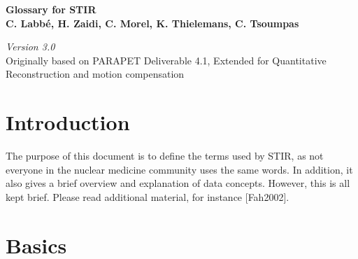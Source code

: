 \documentclass{article}
\begin{document}
\begin{center}
\textbf{{\huge Glossary for STIR}}\\
\textbf{C. Labb\'{e}, H. Zaidi, C. Morel, K. Thielemans, C. Tsoumpas}
\end{center}

\begin{center}
\textit{Version 3.0}\\
Originally based on PARAPET Deliverable 4.1,
Extended for Quantitative Reconstruction and motion compensation

\end{center}

\section*{Introduction}
The purpose of this document is to define the terms used by STIR, as not everyone in the nuclear 
medicine community uses the same words. In addition, it also gives a brief overview and explanation 
of data concepts. However, this is all kept brief. Please read additional material, for instance
[Fah2002].

\section*{Basics}
\end{document}
